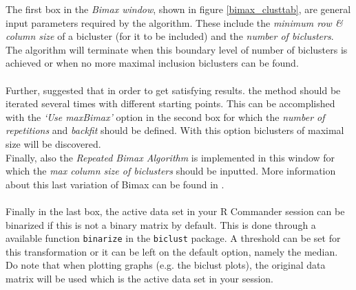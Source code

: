 \documentclass[a4paper]{article}\usepackage[]{graphicx}\usepackage[]{color}
\begin{document}
\noindent The first box in the {\it Bimax window}, shown in figure
\ref{bimax_clusttab}, are general input parameters required by the algorithm.
These include the {\it minimum row \& column size} of a bicluster (for it to be
included) and the {\it number of biclusters}. The algorithm will terminate when
this boundary level of number of biclusters is achieved or when no more maximal
inclusion biclusters can be found.
\\ \\
Further, \citet{Kaiser2008} suggested that in order to get satisfying
results. the method should be iterated several times with different starting
points. This can be accomplished with the {\it `Use maxBimax'} option in the
second box for which the {\it number of repetitions} and {\it backfit} should be
defined. With this option biclusters of maximal size will be discovered.\\
Finally, also the {\it Repeated Bimax Algorithm} is implemented in this window
for which the {\it max column size of biclusters} should be inputted. More
information about this last variation of Bimax can be found in
\citet{Dolnicar2011}.
\\ \\
Finally in the last box, the active data set in your R Commander session can be
binarized if this is not a binary matrix by default. This is done through a
available function \verb|binarize| in the \verb|biclust| package. A threshold
can be set for this transformation or it can be left on the default option,
namely the median. Do note that when plotting graphs (e.g. the biclust plots),
the original data matrix will be used which is the active data set in your session.
\end{document}
